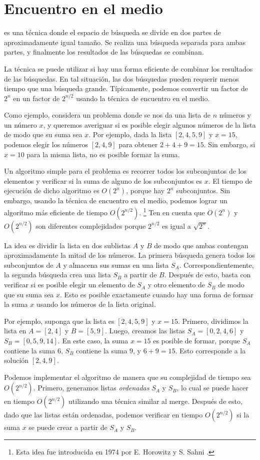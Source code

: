 \section{Encuentro en el medio}


 es una técnica
donde el espacio de búsqueda se divide en
dos partes de aproximadamente igual tamaño.
Se realiza una búsqueda separada
para ambas partes,
y finalmente los resultados de las búsquedas se combinan.

La técnica se puede utilizar
si hay una forma eficiente de combinar los
resultados de las búsquedas.
En tal situación, las dos búsquedas pueden requerir menos
tiempo que una búsqueda grande.
Típicamente, podemos convertir un factor de $2^n$
en un factor de $2^{n/2}$ usando la técnica de encuentro en el
medio.

Como ejemplo, considera un problema donde
se nos da una lista de $n$ números y
un número $x$,
y queremos averiguar si es posible
elegir algunos números de la lista de modo que
su suma sea $x$.
Por ejemplo, dada la lista $[2,4,5,9]$ y $x=15$,
podemos elegir los números $[2,4,9]$ para obtener $2+4+9=15$.
Sin embargo, si $x=10$ para la misma lista,
no es posible formar la suma.

Un algoritmo simple para el problema es recorrer
todos los subconjuntos de los elementos y
verificar si la suma de alguno de los subconjuntos es $x$.
El tiempo de ejecución de dicho algoritmo es $O(2^n)$,
porque hay $2^n$ subconjuntos.
Sin embargo, usando la técnica de encuentro en el medio,
podemos lograr un algoritmo más eficiente de tiempo $O(2^{n/2})$.
\footnote{Esta idea fue introducida en 1974 por E. Horowitz y
    S. Sahni \cite{hor74}.}
Ten en cuenta que $O(2^n)$ y $O(2^{n/2})$ son diferentes
complejidades porque $2^{n/2}$ es igual a $\sqrt{2^n}$.

La idea es dividir la lista en
dos sublistas $A$ y $B$ de modo que ambas
contengan aproximadamente la mitad de los números.
La primera búsqueda genera todos los subconjuntos
de $A$ y almacena sus sumas en una lista $S_A$.
Correspondientemente, la segunda búsqueda crea
una lista $S_B$ a partir de $B$.
Después de esto, basta con verificar si es posible
elegir un elemento de $S_A$ y otro
elemento de $S_B$ de modo que su suma sea $x$.
Esto es posible exactamente cuando hay una forma de
formar la suma $x$ usando los números de la lista original.

Por ejemplo, suponga que la lista es $[2,4,5,9]$ y $x=15$.
Primero, dividimos la lista en $A=[2,4]$ y $B=[5,9]$.
Luego, creamos las listas
$S_A=[0,2,4,6]$ y $S_B=[0,5,9,14]$.
En este caso, la suma $x=15$ es posible de formar,
porque $S_A$ contiene la suma $6$,
$S_B$ contiene la suma $9$, y $6+9=15$.
Esto corresponde a la solución $[2,4,9]$.

Podemos implementar el algoritmo de manera que
su complejidad de tiempo sea $O(2^{n/2})$.
Primero, generamos listas \emph{ordenadas} $S_A$ y $S_B$,
lo cual se puede hacer en tiempo $O(2^{n/2})$ utilizando una técnica similar al merge.
Después de esto, dado que las listas están ordenadas,
podemos verificar en tiempo $O(2^{n/2})$ si
la suma $x$ se puede crear a partir de $S_A$ y $S_B$.
